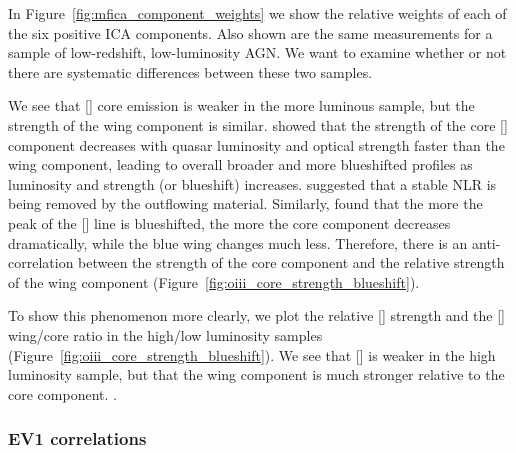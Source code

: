 In Figure~\ref{fig:mfica_component_weights} we show the relative weights of each of the six positive ICA components. 
Also shown are the same measurements for a sample of low-redshift, low-luminosity AGN. 
We want to examine whether or not there are systematic differences between these two samples. 

We see that [] core emission is weaker in the more luminous sample, but the strength of the wing component is similar. 
\citet{shen14} showed that the strength of the core [] component decreases with quasar luminosity and optical  strength faster than the wing component, leading to overall broader and more blueshifted profiles as luminosity and  strength (or  blueshift) increases. 
\citet{shen14} suggested that a stable NLR is being removed by the outflowing material. 
Similarly, \citet{zhang11} found that the more the peak of the [] line is blueshifted, the more the core component decreases dramatically, while the blue wing changes much less. 
Therefore, there is an anti-correlation between the strength of the core component and the relative strength of the wing component (Figure~\ref{fig:oiii_core_strength_blueshift}). 

To show this phenomenon more clearly, we plot the relative [] strength and the [] wing/core ratio in the high/low luminosity samples (Figure~\ref{fig:oiii_core_strength_blueshift}). 
We see that [] is weaker in the high luminosity sample, but that the wing component is much stronger relative to the core component. 
. 

\subsubsection{EV1 correlations}

